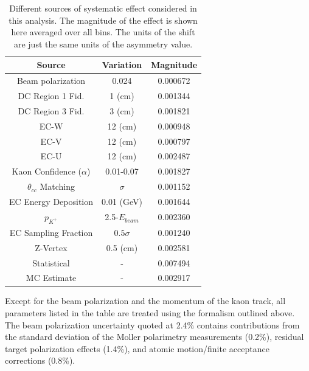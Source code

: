 \begin{table}
  \centering
  \begin{tabular}{c|c|c}
    Source                     & Variation & Magnitude \\ 
    \hline
    Beam polarization          & 0.024          & 0.000672 \\ 
    DC Region 1 Fid.           & 1 (cm)         & 0.001344 \\ 
    DC Region 3 Fid.           & 3 (cm)         & 0.001821 \\
    EC-W                       & 12 (cm)        & 0.000948 \\ 
    EC-V                       & 12 (cm)        & 0.000797 \\
    EC-U                       & 12 (cm)        & 0.002487 \\
    Kaon Confidence ($\alpha$) & 0.01-0.07      & 0.001827 \\
    $\theta_{cc}$ Matching     & $\sigma$       & 0.001152 \\
    EC Energy Deposition       & 0.01 (GeV)     & 0.001644 \\
    $p_{K^+}$                  & 2.5-$E_{beam}$ & 0.002360 \\ 
    EC Sampling Fraction       & $0.5 \sigma$   & 0.001240 \\
    Z-Vertex                   & 0.5 (cm)       & 0.002581 \\
    \hline 
    Statistical                & -              & 0.007494 \\ 
    \hline
    MC Estimate                & -              & 0.002917
  \end{tabular}
  \caption{Different sources of systematic effect considered in this analysis.  The magnitude of the effect is shown here averaged over all bins.  The units of the shift are just the same units of the asymmetry value. }
  \label{table:kaon-systematics}
\end{table}


Except for the beam polarization and the momentum of the kaon track, all parameters listed in the table are treated using the formalism outlined above.  The beam polarization uncertainty quoted at 2.4\% contains contributions from the standard deviation of the Moller polarimetry measurements (0.2\%), residual target polarization effects (1.4\%), and atomic motion/finite acceptance corrections (0.8\%).\\

